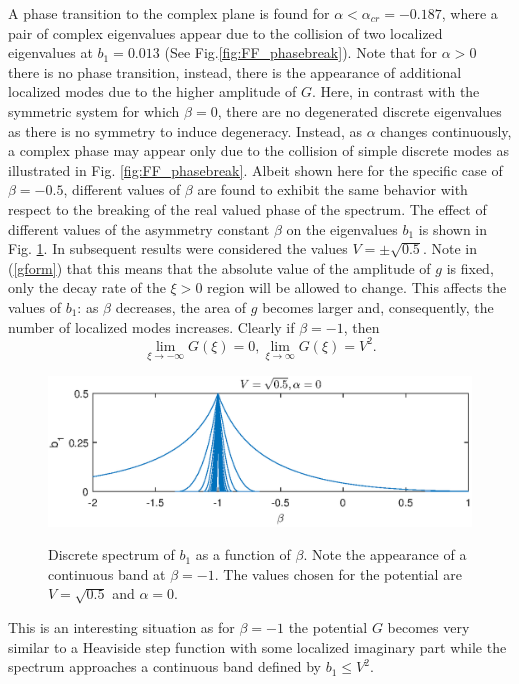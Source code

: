 \documentclass[aps,pre,showpacs,twocolumn]{revtex4}
\begin{document}
A phase transition to the complex plane is found for 
$\alpha<\alpha_{cr} = -0.187$,  where a pair of complex 
eigenvalues appear due to the collision of two localized eigenvalues at $b_1=0.013$ (See Fig.\ref{fig:FF_phasebreak}). Note that for $\alpha>0$ there is no phase transition, instead, there is the appearance of additional localized modes due to the higher amplitude of $G$. Here, in contrast with the symmetric system for which $\beta=0$, there are no degenerated discrete eigenvalues as there is no symmetry to induce degeneracy. Instead, as $\alpha$ changes continuously, a complex 
phase may appear only due to the collision of simple discrete 
modes as illustrated in Fig. \ref{fig:FF_phasebreak}. Albeit shown 
here for the specific case of $\beta=-0.5$, different values of 
$\beta$ are found to exhibit the same behavior with respect to 
the breaking of the real valued phase of the spectrum. The effect of different values of the asymmetry constant $\beta$ on the 
eigenvalues $b_1$ is shown in Fig. \ref{fig:beta_spectrum}. In 
subsequent results were considered the values $V=\pm\sqrt{0.5}$. 
Note in (\ref{gform}) that this means that the absolute value of 
the amplitude of $g$ is fixed, only the decay rate of the $\xi>0$ 
region will be allowed to change. This affects the values of 
$b_1$: as $\beta$ decreases, the area of $g$ becomes larger and, consequently,  the number of localized modes increases. Clearly if $\beta=-1$, then
\begin{subequations}
\begin{equation}
\lim_{\xi\to -\infty}G(\xi) =0,
\end{equation}
\begin{equation}
\lim_{\xi\to \infty}G(\xi) =V^2.
\end{equation}
\end{subequations}
\begin{figure}[!htb]
\begin{center}
\scalebox{.55} {\includegraphics{beta_spectrum.eps}}
\end{center}
\caption{Discrete spectrum of $b_1$ as a function of $\beta$. Note the appearance of a continuous band at $\beta=-1$. The values chosen for the potential are $V=\sqrt{0.5}$ and $\alpha=0$.}
\label{fig:beta_spectrum}
\end{figure}
This is an interesting situation as for $\beta=-1$ the potential $G$ becomes very similar to a Heaviside step function with some localized imaginary part while the spectrum approaches a continuous band defined by $b_1\leq V^2$.
\end{document}
